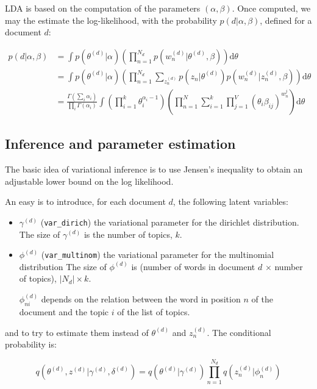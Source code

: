 \documentclass[10pt]{article}
\begin{document}
LDA is based on the computation of the parameters $(\alpha, \beta)$. Once computed, we may the estimate the log-likelihood, with the probability $p(d|\alpha, \beta)$, defined for a document $d$:

\begin{align*}
p(d|\alpha, \beta) 
& = \int p(\theta^{(d)}|\alpha) \left( \prod_{n=1}^{N_{d}} p(w_n^{(d)}|\theta^{(d)}, \beta)\right) \text{d}\theta  \\
& = \int p(\theta^{(d)}|\alpha) \left( \prod_{n=1}^{N_{d}} \sum_{z_n^{(d)}} p(z_n|\theta^{(d)}) p(w_n^{(d)}|z_n^{(d)}, \beta)\right) \text{d}\theta  \\
& = \frac{\Gamma\left( \sum_i \alpha_i\right)}{\prod_i \Gamma(\alpha_i)} \int \left( \prod_{i=1}^k \theta_i^{\alpha_i - 1} \right) \left( \prod_{n=1}^N \sum_{i=1}^k \prod_{j=1}^V (\theta_i \beta_{ij})^{w_n^j} \right) \text{d}\theta
\end{align*}

\subsection{Inference and parameter estimation}

The basic idea of variational inference is to use Jensen's inequality to obtain an adjustable lower bound on the log likelihood.

An easy is to introduce, for each document $d$, the following latent variables:
 \begin{itemize}
\setlength\itemsep{-0.2em}
  \item $\gamma^{(d)}$ (\verb"var_dirich") the variational parameter for the dirichlet distribution. The size of $\gamma^{(d)}$ is the number of topics, $k$.
  \item $\phi^{(d)}$ (\verb"var_multinom") the variational parameter for the multinomial distribution The size of $\phi^{(d)}$ is (number of words in document $d$ $\times$ number of topics), $|N_d| \times k$.
  
  $\phi_{ni}^{(d)}$ depends on the relation between the word in position $n$ of the document and the topic $i$ of the list of topics.
   \end{itemize}

and to try to estimate them instead of $\theta^{(d)}$ and $z_n^{(d)}$. The conditional probability is:

\[ q(\theta^{(d)}, z^{(d)}|\gamma^{(d)}, \delta^{(d)}) = q(\theta^{(d)}|\gamma^{(d)}) \prod_{n=1}^{N_d} q(z_n^{(d)}|\phi_n^{(d)})\]
\end{document}
